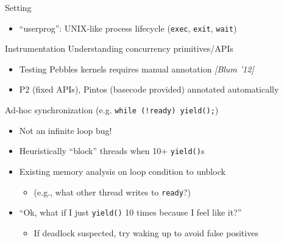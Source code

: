 \documentclass[xcolor=dvipsnames]{beamer}
\begin{document}
\begin{frame}{Setting}
\begin{itemize}
\begin{itemize}
			\item ``userprog'': UNIX-like process lifecycle
				({\tt exec}, %
				{\tt exit}, {\tt wait})
		\end{itemize}
	\end{itemize}
\end{frame}

\begin{frame}{Instrumentation}
	Understanding concurrency primitives/APIs
	\begin{itemize}
		\item Testing Pebbles kernels requires manual annotation {\em [Blum '12]}
		\item P2 (fixed APIs), Pintos (basecode provided) annotated automatically
	\end{itemize}
	\pause
	\linegap

	Ad-hoc synchronization (e.g. {\tt while (!ready) yield();})
	\begin{itemize}
		\item Not an infinite loop bug!
		\item Heuristically ``block'' threads when 10+ {\tt yield()}s %
		\item Existing memory analysis %
			on loop condition to unblock
			\begin{itemize}
				\item (e.g., what other thread writes to {\tt ready}?)
			\end{itemize}
			\pause
		\item ``Ok, what if I just {\tt yield()} 10 times because I feel like it?''
			\begin{itemize}
				\item If deadlock suspected, try waking up to avoid false positives
			\end{itemize}
	\end{itemize}

\end{frame}
\end{document}
